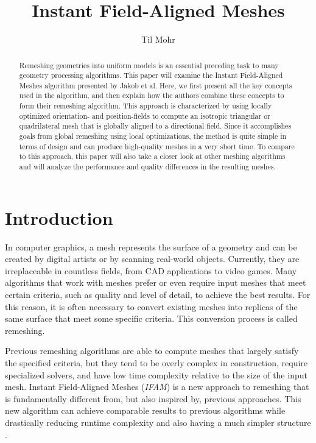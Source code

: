 \documentclass{ACGSeminar}
\begin{document}
\title{Instant Field-Aligned Meshes}

\author{Til Mohr}


\maketitle


\begin{abstract}
Remeshing geometries into uniform models is an essential preceding task to many geometry processing algorithms. This paper will examine the Instant Field-Aligned Meshes algorithm presented by Jakob et al. Here, we first present all the key concepts used in the algorithm, and then explain how the authors combine these concepts to form their remeshing algorithm. This approach is characterized by using locally optimized orientation- and position-fields to compute an isotropic triangular or quadrilateral mesh that is globally aligned to a directional field. Since it accomplishes goals from global remeshing using local optimizations, the method is quite simple in terms of design and can produce high-quality meshes in a very short time. To compare to this approach, this paper will also take a closer look at other meshing algorithms and will analyze the performance and quality differences in the resulting meshes.
\end{abstract}

\tableofcontents

\newpage

\section{Introduction}
In computer graphics, a mesh represents the surface of a geometry and can be created by digital artists or by scanning real-world objects. Currently, they are irreplaceable in countless fields, from CAD applications to video games. Many algorithms that work with meshes prefer or even require input meshes that meet certain criteria, such as quality and level of detail, to achieve the best results. For this reason, it is often necessary to convert existing meshes into replicas of the same surface that meet some specific criteria. This conversion process is called remeshing.\bigskip

Previous remeshing algorithms are able to compute meshes that largely satisfy the specified criteria, but they tend to be overly complex in construction, require specialized solvers, and have low time complexity relative to the size of the input mesh. Instant Field-Aligned Meshes (\textit{IFAM}) is a new approach to remeshing that is fundamentally different from, but also inspired by, previous approaches. This new algorithm can achieve comparable results to previous algorithms while drastically reducing runtime complexity and also having a much simpler structure \cite{jakob2015instant}.\bigskip
\end{document}
